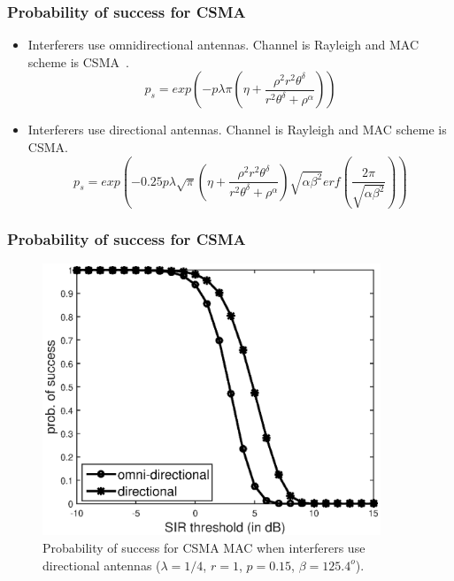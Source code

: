 \documentclass{beamer}
\begin{document}
\begin{frame}
\frametitle{\color{WPI_red} Probability of success for CSMA}
\begin{itemize}

\item Interferers use omnidirectional antennas. Channel is Rayleigh and MAC scheme is CSMA~\cite{haenggi2009}.
\begin{equation*}
p_s = exp\left(-p\lambda\pi \left(\eta+\frac{\rho^2r^2\theta^\delta}{r^2\theta^\delta+\rho^\alpha}\right)\right)
\end{equation*}

\item Interferers use directional antennas. Channel is Rayleigh and MAC scheme is CSMA.
\begin{equation*}
p_s = exp\left(-0.25p\lambda\sqrt{\pi}  \left(\eta+\frac{\rho^2r^2\theta^\delta}{r^2\theta^\delta+\rho^\alpha}\right)\sqrt{\alpha\beta^2} erf\left(\frac{2\pi}{\sqrt{\alpha\beta^2}}\right)\right)
\end{equation*}



\end{itemize}

\end{frame}



\begin{frame}
\frametitle{\color{WPI_red} Probability of success for CSMA}

\begin{figure}
    \centering
    \includegraphics[resolution=2400, width=0.9\textwidth]{csma.eps}
    \caption{Probability of success for CSMA MAC when interferers use directional antennas ($\lambda=1/4$, $r=1$, $p=0.15$, $\beta=125.4^o$).}
\end{figure}



\end{frame}
\end{document}
